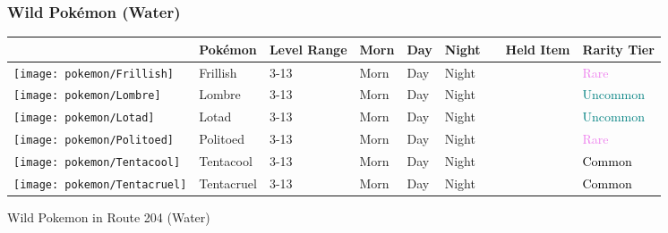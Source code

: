 \subsubsection{Wild Pokémon (Water)}%
\label{ssubsec:WildPokmon(Water)}%
\begin{longtable}{||l l l l l l l l l||}%
\hline%
&Pokémon&Level Range&Morn&Day&Night&&Held Item&Rarity Tier\\%
\hline%
\endhead%
\hline%
\texttt{[image: pokemon/Frillish]}&Frillish&3{-}13&Morn&Day&Night&&&\textcolor{violet}{%
Rare%
}\\%
\hline%
\texttt{[image: pokemon/Lombre]}&Lombre&3{-}13&Morn&Day&Night&&&\textcolor{teal}{%
Uncommon%
}\\%
\hline%
\texttt{[image: pokemon/Lotad]}&Lotad&3{-}13&Morn&Day&Night&&&\textcolor{teal}{%
Uncommon%
}\\%
\hline%
\texttt{[image: pokemon/Politoed]}&Politoed&3{-}13&Morn&Day&Night&&&\textcolor{violet}{%
Rare%
}\\%
\hline%
\texttt{[image: pokemon/Tentacool]}&Tentacool&3{-}13&Morn&Day&Night&&&\textcolor{black}{%
Common%
}\\%
\hline%
\texttt{[image: pokemon/Tentacruel]}&Tentacruel&3{-}13&Morn&Day&Night&&&\textcolor{black}{%
Common%
}\\%
\hline%
\end{longtable}%
\caption{Wild Pokemon in Route 204 (Water)}